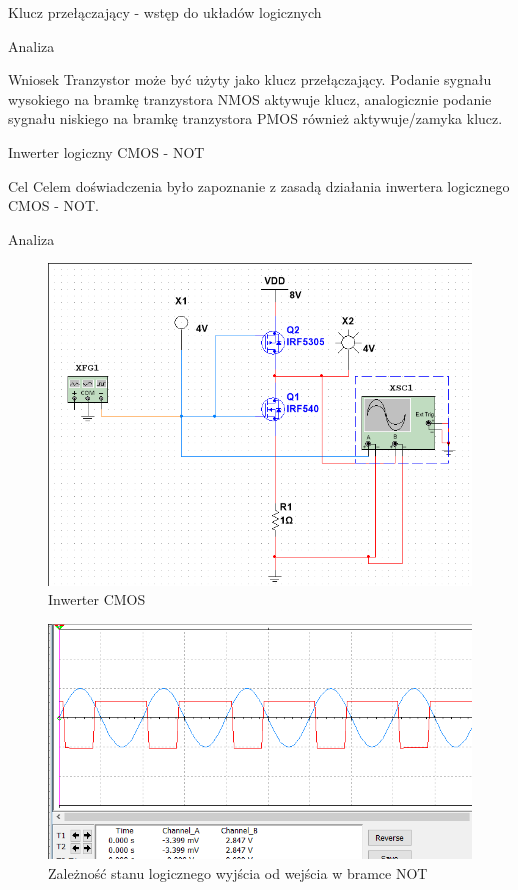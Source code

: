\documentclass[a4paper]{scrartcl}
\begin{document}
\begin{section}{Klucz przełączający - wstęp do układów logicznych}
\begin{subsection}{Analiza}
				\pagebreak
		\end{subsection}
		\pagebreak
		\begin{subsection}{Wniosek}
			Tranzystor może być użyty jako klucz przełączający. Podanie sygnału wysokiego na bramkę tranzystora NMOS aktywuje klucz, analogicznie podanie sygnału niskiego na bramkę tranzystora PMOS również aktywuje/zamyka klucz.
		\end{subsection}
	\end{section}
	\begin{section}{Inwerter logiczny CMOS - NOT}
		\begin{subsection}{Cel}
			Celem doświadczenia było zapoznanie z zasadą działania inwertera logicznego CMOS - NOT.
		\end{subsection}
		\begin{subsection}{Analiza}
				\begin{figure}[ht]
				\begin{center}
					\includegraphics[width=0.5\linewidth]{exercise-7-inwerter-circuit}
					\caption{Inwerter CMOS}
					\label{fig:circuit-7-cmos}
				\end{center}
				\end{figure}
				\begin{figure}[ht]
				\begin{center}
					\includegraphics[width=0.5\linewidth]{exercise-7-inwerter-osciloscope}
					\caption{Zależność stanu logicznego wyjścia od wejścia w bramce NOT}
					\label{fig:circuit-7-cmos}
				\end{center}
				\end{figure}
				\begin{table}[!ht]

\end{table}
\end{subsection}
\end{section}
\end{document}
